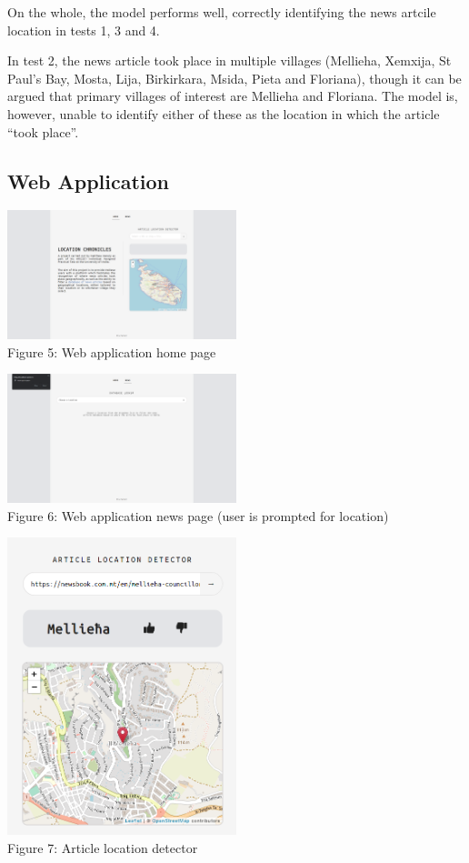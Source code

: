 \documentclass[a4paper, oneside, 11pt]{article}
\begin{document}
\begin{multicols*}{2}
  On the whole, the model performs well, correctly identifying the news artcile location in tests 1, 3 and 4.

  In test 2, the news article took place in multiple villages (Mellieha, Xemxija, St Paul’s Bay, Mosta, Lija, Birkirkara, Msida, Pieta and Floriana), though it can be argued that primary villages of interest are Mellieha and Floriana. The model is, however, unable to identify either of these as the location in which the article ``took place''.


  \subsection{Web Application}
  \begin{center}
    \includegraphics[width=0.5\textwidth]{./figures/homepage.png} \\
    Figure 5: Web application home page
  \end{center}

  \begin{center}
    \includegraphics[width=0.5\textwidth]{./figures/newspagelocation.png} \\
    Figure 6: Web application news page (user is prompted for location)
  \end{center}

  \begin{center}
    \includegraphics[width=0.5\textwidth]{./figures/locationdetector.png} \\
    Figure 7: Article location detector
  \end{center}


\end{multicols*}
\end{document}
